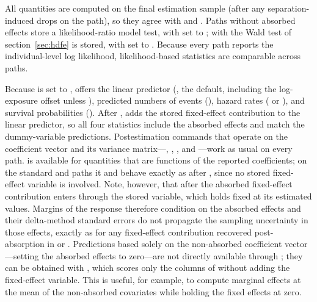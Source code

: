 \documentclass[12pt,a4paper]{article}
\begin{document}
All quantities are computed on the final estimation sample (after any
separation-induced drops on the  path), so they agree
with  and . Paths without absorbed effects
store a likelihood-ratio model test, with  set to
; with  the Wald test of
section~\ref{sec:hdfe} is stored, with
 set to . Because every path reports the
individual-level log likelihood, likelihood-based statistics are
comparable across paths.

\begin{sloppypar}
Because  is set to , 
offers the linear predictor (, the default, including the
log-exposure offset unless ), predicted numbers of
events (), hazard rates ( or ), and
survival probabilities ().  After ,
 adds the stored fixed-effect contribution to the linear
predictor, so all four statistics include the absorbed effects and
match the dummy-variable  predictions.  Postestimation
commands that operate on the coefficient vector and its variance
matrix---, , , and
---work as usual on every path.   is
available for quantities that are functions of the reported
coefficients; on the standard and  paths it and
 behave exactly as after , since no stored
fixed-effect variable is involved.  Note, however, that after
 the absorbed fixed-effect contribution enters
 through the stored  variable, which
 holds fixed at its estimated values.  Margins of the
response therefore condition on the absorbed effects and their
delta-method standard errors do not propagate the sampling uncertainty
in those effects, exactly as for any fixed-effect contribution
recovered post-absorption in  or .
Predictions based solely on the non-absorbed coefficient vector---setting
the absorbed effects to zero---are not directly available through
; they can be obtained with
, which scores only the
columns of  without adding the fixed-effect variable.  This
is useful, for example, to compute marginal effects at the mean of the
non-absorbed covariates while holding the fixed effects at zero.
\end{sloppypar}
\end{document}

